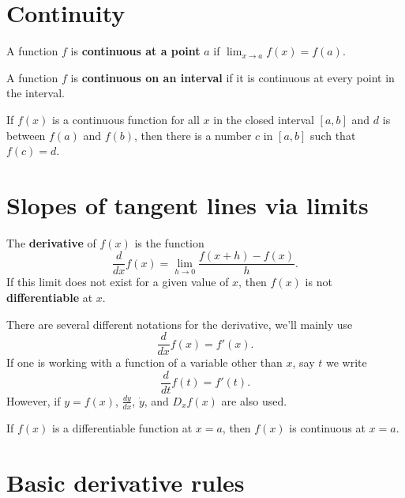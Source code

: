 \documentclass{ximera}
\newcommand{\dd}[2][]{\frac{d #1}{d #2}}
\newcommand{\ddx}{\frac{d}{dx}}
\begin{document}
\section*{Continuity}


\begin{definition} 
A function $f$ is \textbf{continuous at a point} $a$ if $\lim_{x\to a}
f(x) = f(a)$.
\end{definition}



\begin{definition} 
A function $f$ is \textbf{continuous on an interval} if it is
continuous at every point in the interval.
\end{definition}

\begin{theorem}
If $f(x)$ is a continuous function for all $x$ in the closed interval
$[a,b]$ and $d$ is between $f(a)$ and $f(b)$, then there is a number
$c$ in $[a, b]$ such that $f(c) = d$.
\end{theorem}



\section*{Slopes of tangent lines via limits}

\begin{definition}
The \textbf{derivative} of $f(x)$ is the function
\[
\ddx f(x) = \lim_{h\to 0} \frac{f(x+h) - f(x)}{h}.
\]
If this limit does not exist for a given value of $x$, then $f(x)$ is
not \textbf{differentiable} at $x$.
\end{definition}


\begin{definition}
There are several different notations for the derivative, we'll mainly
use
\[
\ddx f(x) = f'(x).
\]
If one is working with a function of a variable other than $x$, say $t$ we write
\[
\dd{t} f(t) = f'(t).
\]
However, if $y = f(x)$, $\dd[y]{x}$, $\dot{y}$, and $D_x f(x)$ are
also used.
\end{definition}


\begin{theorem}
If $f(x)$ is a differentiable function at $x = a$, then $f(x)$ is
continuous at $x=a$.
\end{theorem}



\section*{Basic derivative rules}
\end{document}
